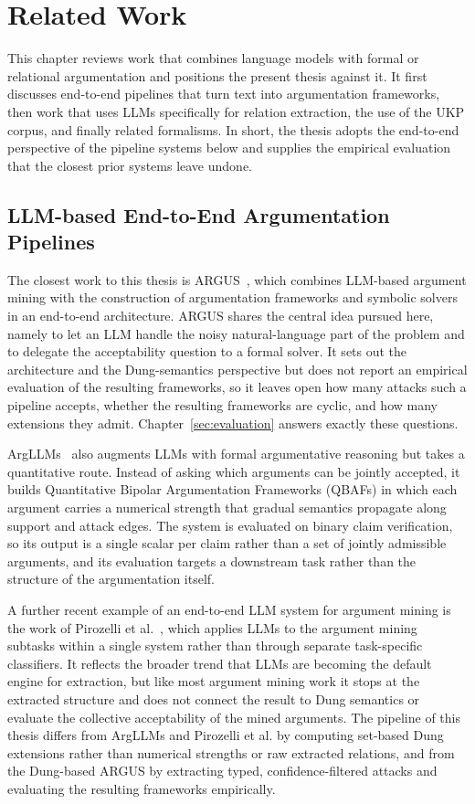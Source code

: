 %
\chapter{Related Work}
\label{sec:related}

This chapter reviews work that combines language models with formal or
relational argumentation and positions the present thesis against it. It first
discusses end-to-end pipelines that turn text into argumentation frameworks,
then work that uses LLMs specifically for relation extraction, the use of the
UKP corpus, and finally related formalisms. In short, the thesis adopts the
end-to-end perspective of the pipeline systems below and supplies the
empirical evaluation that the closest prior systems leave undone.

\section{LLM-based End-to-End Argumentation Pipelines}
\label{sec:related:pipelines}

The closest work to this thesis is ARGUS~\cite{argus}, which combines LLM-based
argument mining with the construction of argumentation frameworks and symbolic
solvers in an end-to-end architecture. ARGUS shares the central idea pursued
here, namely to let an LLM handle the noisy natural-language part of the problem
and to delegate the acceptability question to a formal solver. It sets out the
architecture and the Dung-semantics perspective but does not report an empirical
evaluation of the resulting frameworks, so it leaves open how many attacks such a
pipeline accepts, whether the resulting frameworks are cyclic, and how many
extensions they admit. Chapter~\ref{sec:evaluation} answers exactly these
questions.

ArgLLMs~\cite{argLLMs} also augments LLMs with formal argumentative reasoning but
takes a quantitative route. Instead of asking which arguments can be jointly
accepted, it builds Quantitative Bipolar Argumentation Frameworks (QBAFs) in
which each argument carries a numerical strength that gradual semantics propagate
along support and attack edges. The system is evaluated on binary claim
verification, so its output is a single scalar per claim rather than a set of
jointly admissible arguments, and its evaluation targets a downstream task
rather than the structure of the argumentation itself.

A further recent example of an end-to-end LLM system for argument mining is the
work of Pirozelli et al.~\cite{pirozelli2026llm}, which applies LLMs to the
argument mining subtasks within a single system rather than through separate
task-specific classifiers. It reflects the broader trend that LLMs are becoming
the default engine for extraction, but like most argument mining work it stops at
the extracted structure and does not connect the result to Dung semantics or
evaluate the collective acceptability of the mined arguments. The pipeline of
this thesis differs from ArgLLMs and Pirozelli et al. by computing set-based
Dung extensions rather than numerical strengths or raw extracted relations,
and from the Dung-based ARGUS by extracting typed, confidence-filtered attacks
and evaluating the resulting frameworks empirically.


